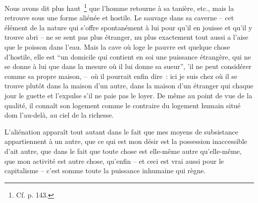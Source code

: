 \documentclass[french,twoside]{book} %
\begin{document}
Nous avons dit plus haut \footnote{Cf. p. 143.} que l’homme retourne à sa tanière, etc., mais la retrouve sous une forme aliénée et hostile. Le sauvage dans sa caverne – cet élément de la nature qui s’offre spontanément à lui pour qu’il en jouisse et qu’il y trouve abri – ne se sent pas plus étranger, nu plus exactement tout aussi a l’aise que le poisson dans l’eau. Mais la cave où loge le pauvre est quelque chose d’hostile, elle est “un domicile qui contient en soi une puissance étrangère, qui ne se donne à lui que dans la mesure où il lui donne sa sueur”, 'il ne peut considérer comme sa propre maison, – où il pourrait enfin dire : ici je suis chez où il se trouve plutôt dans la maison d’un autre, dans la maison d’un étranger qui chaque jour le guette et l’expulse s’il ne paie pas le loyer. De même au point de vue de la qualité, il connaît son logement comme le contraire du logement humain situé dom l’au-delà, au ciel de la richesse.\par
L’aliénation apparaît tout autant dans le fait que mes moyens de subsistance appartiennent à un autre, que ce qui est mon désir est la possession inaccessible d’ait autre, que dans le fait que toute chose est elle-même autre qu’elle-même, que mon activité est autre chose, qu’enfin – et ceci est vrai aussi pour le capitalisme – c’est somme toute la puissance inhumaine qui règne.\par
\end{document}

